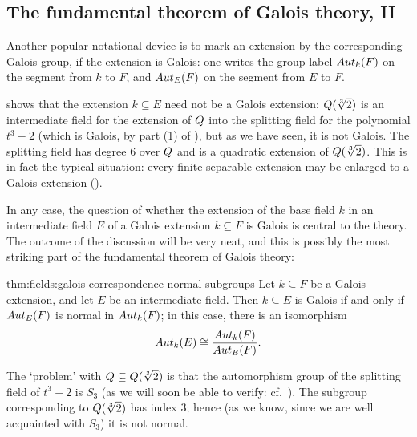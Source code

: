 \subsection{The fundamental theorem of Galois theory, II}
\label{subsec:fields:the-fundamental-theorem-of-galois-theory-ii}
Another popular notational device is to mark an extension by the
corresponding Galois group, if the extension is Galois: one writes the
group label $Aut_k(F)$ on the segment from $k$ to $F$, and
$Aut_E(F)$ on the segment from $E$ to $F$.

 shows that the extension $k \subseteq E$
need not be a Galois extension: $Q(\sqrt[3]{2})$ is an intermediate
field for the extension of $Q$ into the splitting field for the
polynomial $t^3 - 2$ (which is Galois, by part (1) of
), but as we have seen, it is not Galois. The
splitting field has degree $6$ over $Q$ and is a quadratic extension
of $Q(\sqrt[3]{2})$. This is in fact the typical situation: every
finite separable extension may be enlarged to a Galois extension
().

In any case, the question of whether the extension of the base field
$k$ in an intermediate field $E$ of a Galois extension $k \subseteq F$
is Galois is central to the theory. The outcome of the discussion will
be very neat, and this is possibly the most striking part of the
fundamental theorem of Galois theory:
\begin{thm}{}{thm:fields:galois-correspondence-normal-subgroups}
  Let $k \subseteq F$ be a Galois extension, and let $E$ be an
  intermediate field. Then $k \subseteq E$ is Galois if and only if
  $Aut_E(F)$ is normal in $Aut_k(F)$; in this case, there is an
  isomorphism
  \[
    Aut_k(E) \cong \frac{Aut_k(F)}{Aut_E(F)}.
  \]
\end{thm}
The `problem' with $Q \subseteq Q(\sqrt[3]{2})$ is that the
automorphism group of the splitting field of $t^3 - 2$ is $S_3$ (as we
will soon be able to verify: cf.\ ). The
subgroup corresponding to $Q(\sqrt[3]{2})$ has index $3$; hence (as
we know, since we are well acquainted with $S_3$) it is not normal.

